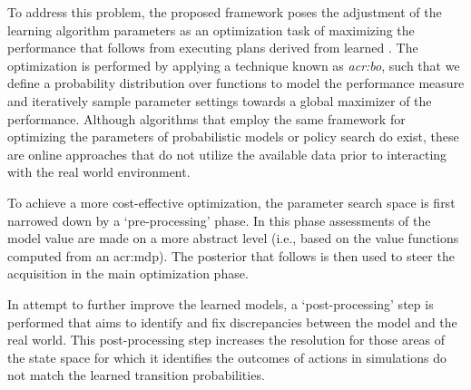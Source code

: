 To address this problem, the proposed framework poses the adjustment of the learning algorithm parameters as an optimization task of maximizing the performance that follows from executing plans derived from learned .
The optimization is performed by applying a technique known as \textit{\acrfull{acr:bo}}, such that we define a probability distribution over functions to model the performance measure and iteratively sample parameter settings towards a global maximizer of the performance.
Although algorithms that employ the same framework for optimizing the parameters of probabilistic models \cite{ghavamzadeh2015bayesian, guez2012efficient} or policy search \cite{deisenroth2011pilco, wilson2014using} do exist, these are online approaches that do not utilize the available data prior to interacting with the real world environment.


To achieve a more cost-effective optimization, the parameter search space is first narrowed down by a `pre-processing' phase.
In this phase assessments of the model value are made on a more abstract level (i.e., based on the value functions computed from an \acrshort{acr:mdp}).
The posterior that follows is then used to steer the acquisition in the main optimization phase.

In attempt to further improve the learned models, a `post-processing' step is performed that aims to identify and fix discrepancies between the model and the real world.
This post-processing step increases the resolution for those areas of the state space for which it identifies the outcomes of actions in simulations do not match the learned transition probabilities.

